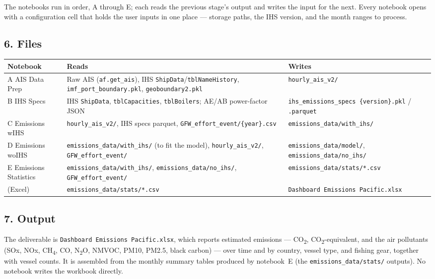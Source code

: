 \documentclass[
  11pt,
]{article}
\begin{document}
The notebooks run in order, A through E; each reads the previous stage's
output and writes the input for the next. Every notebook opens with a
configuration cell that holds the user inputs in one place --- storage
paths, the IHS version, and the month ranges to process.

\subsection{6. Files}\label{files}

\begin{longtable}[]{@{}
  >{\raggedright\arraybackslash}p{}
  >{\raggedright\arraybackslash}p{}
  >{\raggedright\arraybackslash}p{}@{}}
\toprule
\textbf{Notebook} & \textbf{Reads} & \textbf{Writes} \\
\midrule
\endhead
A AIS Data Prep & Raw AIS (\texttt{af.get\_ais}), IHS
\texttt{ShipData}/\texttt{tblNameHistory}, \texttt{imf\_port\_boundary.pkl},
\texttt{geoboundary2.pkl} & \texttt{hourly\_ais\_v2/} \\
B IHS Specs & IHS \texttt{ShipData}, \texttt{tblCapacities},
\texttt{tblBoilers}; AE/AB power-factor JSON &
\texttt{ihs\_emissions\_specs\ \{version\}.pkl} / \texttt{.parquet} \\
C Emissions wIHS & \texttt{hourly\_ais\_v2/}, IHS specs parquet,
\texttt{GFW\_effort\_event/\{year\}.csv} &
\texttt{emissions\_data/with\_ihs/} \\
D Emissions woIHS & \texttt{emissions\_data/with\_ihs/} (to fit the
model), \texttt{hourly\_ais\_v2/}, \texttt{GFW\_effort\_event/} &
\texttt{emissions\_data/model/}, \texttt{emissions\_data/no\_ihs/} \\
E Emissions Statistics & \texttt{emissions\_data/with\_ihs/},
\texttt{emissions\_data/no\_ihs/}, \texttt{GFW\_effort\_event/} &
\texttt{emissions\_data/stats/*.csv} \\
(Excel) & \texttt{emissions\_data/stats/*.csv} &
\texttt{Dashboard\ Emissions\ Pacific.xlsx} \\
\bottomrule
\end{longtable}

\subsection{7. Output}\label{output}

The deliverable is \texttt{Dashboard\ Emissions\ Pacific.xlsx}, which
reports estimated emissions --- CO\textsubscript{2},
CO\textsubscript{2}-equivalent, and the air pollutants (SOx, NOx,
CH\textsubscript{4}, CO, N\textsubscript{2}O, NMVOC, PM10, PM2.5, black
carbon) --- over time and by country, vessel type, and fishing gear,
together with vessel counts. It is assembled from the monthly summary
tables produced by notebook~E (the \texttt{emissions\_data/stats/}
outputs). No notebook writes the workbook directly.
\end{document}
